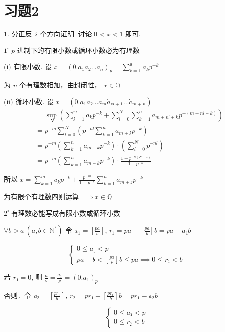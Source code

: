 \section*{习题2}

1. 分正反 2 个方向证明. 讨论 $0 < x < 1$ 即可.

$1^\circ \ p$ 进制下的有限小数或循环小数必为有理数

(i) 有限小数. 设 $x = (0.a_1 a_2 \dots a_n)_p = \sum_{k=1}^n a_k p^{-k}$

为 $n$ 个有理数相加，由封闭性， $x \in \mathbb{Q}$.

(ii) 循环小数. 设 $x = (0.a_1 a_2 \dots a_m \dot{a}_{m+1} \dots \dot{a}_{m+n})$
\begin{align*}
    &= \sup_N \left( \sum_{k=1}^m a_k p^{-k} + \sum_{l=0}^N \sum_{k=1}^n a_{m+nl+k} p^{-(m+nl+k)} \right) \\
    &= p^{-m} \sum_{l=0}^N \left( p^{-nl} \sum_{k=1}^n a_{m+k} p^{-k} \right) \\
    &= p^{-m} \left( \sum_{k=1}^n a_{m+k} p^{-k} \right) \cdot \left( \sum_{l=0}^N p^{-nl} \right) \\
    &= p^{-m} \left( \sum_{k=1}^n a_{m+k} p^{-k} \right) \cdot \frac{1 - p^{-n(N+1)}}{1 - p^{-n}}
\end{align*}

所以 $x = \sum_{k=1}^m a_k p^{-k} + \frac{p^{-m}}{1 - p^{-n}} \sum_{k=1}^n a_{m+k} p^{-k}$

为有限个有理数四则运算 $\implies x \in \mathbb{Q}$

$2^\circ \ $有理数必能写成有限小数或循环小数

$\forall b > a \ (a, b \in \mathbb{N}^*)$ 令 $a_1 = \left[\frac{pa}{b}\right]$, $r_1 = pa - \left[\frac{pa}{b}\right]b = pa - a_1 b$

$$
\begin{cases}
0 \le a_1 < p \\
pa - b < \left[\frac{pa}{b}\right]b \le pa \implies 0 \le r_1 < b
\end{cases}
$$

若 $r_1 = 0$, 则 $\frac{a}{b} = \frac{a_1}{p} = (0.a_1)_p$

否则，令 $a_2 = \left[\frac{pr_1}{b}\right]$, $r_2 = pr_1 - \left[\frac{pr_1}{b}\right]b = pr_1 - a_2 b$

$$
\begin{cases}
0 \le a_2 < p \\
0 \le r_2 < b
\end{cases}
$$

